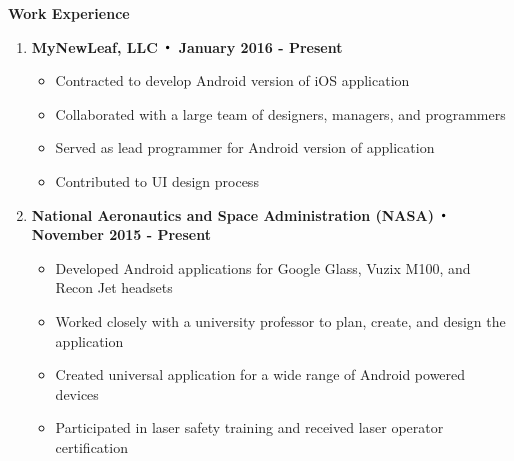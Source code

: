 \noindent\textbf{\large Work Experience}
\begin{enumerate}[label={\Roman*}.]

\item \textbf{MyNewLeaf, LLC $\Bigcdot$ January 2016 - Present}
\begin{itemize}
\item Contracted to develop Android version of iOS application
\item Collaborated with a large team of designers, managers, and programmers
\item Served as lead programmer for Android version of application
\item Contributed to UI design process
\end{itemize}

\item \textbf{National Aeronautics and Space Administration (NASA) $\Bigcdot$ November 2015 - Present}
\begin{itemize}
\item Developed Android applications for Google Glass, Vuzix M100, and Recon Jet headsets
\item Worked closely with a university professor to plan, create, and design the application
\item Created universal application for a wide range of Android powered devices
\item Participated in laser safety training and received laser operator certification

\end{itemize}



\end{enumerate}
